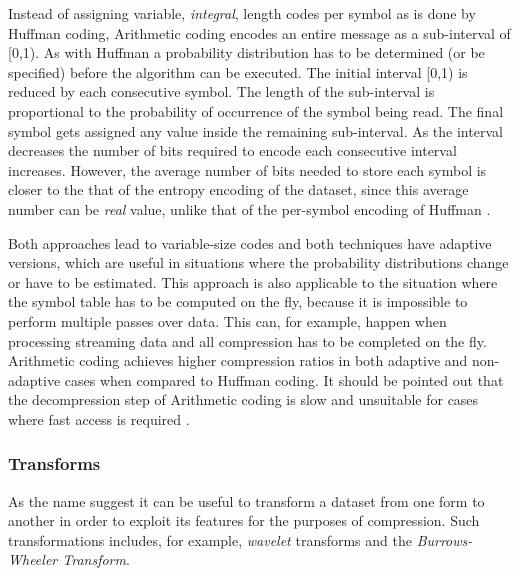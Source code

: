 Instead of assigning variable, \textit{integral}, length codes per symbol as is done by Huffman coding, Arithmetic coding encodes an entire message as a sub-interval of [0,1). As with
Huffman a probability distribution has to be determined (or be specified) before the algorithm can be executed. The initial interval [0,1) is reduced by each consecutive 
symbol. The length of the sub-interval is proportional to the probability of occurrence of the symbol being read. The final symbol gets assigned any value inside the remaining 
sub-interval. As the interval decreases the number of bits required to encode each consecutive interval increases. However, the average number of bits needed to store 
each symbol is closer to the that of the entropy encoding of the dataset, since this average number can be \textit{real} value, unlike that of the per-symbol encoding of Huffman \cite[ch. 2]{salomon2004data}.

Both approaches lead to variable-size codes and both techniques have adaptive versions, which are useful in situations where the probability distributions change or have to be estimated. 
This approach is also applicable to the situation where the symbol table has to be computed on the fly, because it is impossible to perform multiple passes over data. This can, for example,
happen when processing streaming data and all compression has to be completed on the fly. Arithmetic coding achieves higher compression ratios in both adaptive and non-adaptive cases 
when compared to Huffman coding. It should be pointed out that the decompression step of Arithmetic coding is slow and unsuitable for cases where fast access is 
required \cite{ray1995database,williams1999compressing}\cite[ch. 2]{salomon2004data}.

\subsubsection{Transforms}
As the name suggest it can be useful to transform a dataset from one form to another in order to exploit its features for the purposes of compression. Such transformations 
includes, for example, \textit{wavelet} transforms and the \textit{Burrows-Wheeler Transform}. 

